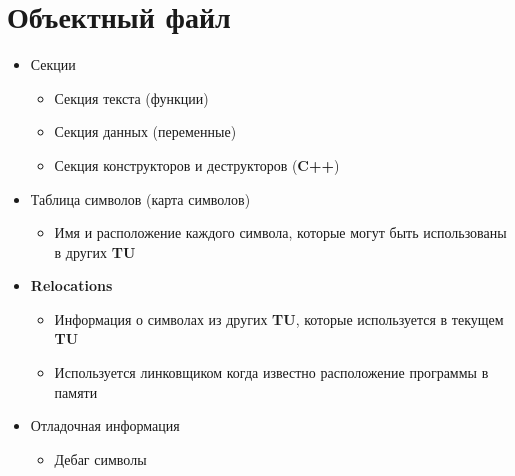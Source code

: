 \documentclass[../../lectures.tex]{subfiles}
\begin{document}
\section{Объектный файл}
\begin{itemize}
    \item Секции
        \begin{itemize}
            \item Секция текста (функции)
            \item Секция данных (переменные)
            \item Секция конструкторов и деструкторов (\textbf{C++})
        \end{itemize}
    \item Таблица символов (карта символов)
        \begin{itemize}
            \item Имя и расположение каждого символа, которые могут быть использованы в других \textbf{TU}
        \end{itemize}
    \item \textbf{Relocations}
        \begin{itemize}
            \item Информация о символах из других \textbf{TU}, которые используется в текущем \textbf{TU}
            \item Используется линковщиком когда известно расположение программы в памяти
        \end{itemize}
    \item Отладочная информация
        \begin{itemize}
            \item Дебаг символы
        \end{itemize}
\end{itemize}

\newpage
\end{document}

